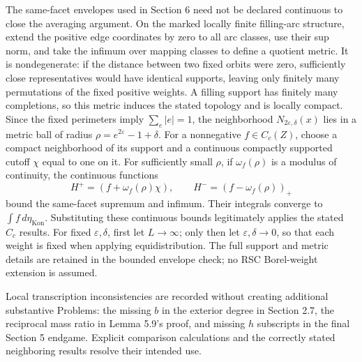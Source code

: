 \documentclass[10pt]{article}
\begin{document}
The same-facet envelopes used in Section 6 need not be declared continuous to close the averaging argument. On the marked locally finite filling-arc structure, extend the positive edge coordinates by zero to all arc classes, use their sup norm, and take the infimum over mapping classes to define a quotient metric. It is nondegenerate: if the distance between two fixed orbits were zero, sufficiently close representatives would have identical supports, leaving only finitely many permutations of the fixed positive weights. A filling support has finitely many completions, so this metric induces the stated topology and is locally compact. Since the fixed perimeters imply \(\sum_e|e|=1\), the neighborhood \(N_{2\varepsilon,\delta}(x)\) lies in a metric ball of radius \(\rho=e^{2\varepsilon}-1+\delta\). For a nonnegative \(f\in C_c(Z)\), choose a compact neighborhood of its support and a continuous compactly supported cutoff \(\chi\) equal to one on it. For sufficiently small \(\rho\), if \(\omega_f(\rho)\) is a modulus of continuity, the continuous functions \[H^+=(f+\omega_f(\rho)\chi),\qquad
 H^-=(f-\omega_f(\rho))_+\] bound the same-facet supremum and infimum. Their integrals converge to \(\int f\,d\eta_{\operatorname{Kon}}\). Substituting these continuous bounds legitimately applies the stated \(C_c\) results. For fixed \(\varepsilon,\delta\), first let \(L\to\infty\); only then let \(\varepsilon,\delta\to0\), so that each weight is fixed when applying equidistribution. The full support and metric details are retained in the bounded envelope check; no RSC Borel-weight extension is assumed.\par
Local transcription inconsistencies are recorded without creating additional substantive Problems: the missing \(b\) in the exterior degree in Section 2.7, the reciprocal mass ratio in Lemma 5.9’s proof, and missing \(h\) subscripts in the final Section 5 endgame. Explicit comparison calculations and the correctly stated neighboring results resolve their intended use.\par
\end{document}
